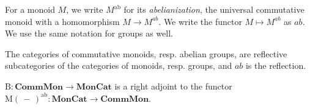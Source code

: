 \documentclass{amsbook} %
\newcommand{\mb}{\mathbf}
\newcommand{\cmon}{\ensuremath{\mb{CommMon}}}
\newcommand{\moncat}{\ensuremath{\mb{MonCat}}}
\numberwithin{section}{chapter}
\begin{document}
\begin{Defi} For a monoid $M$, we write $M^{\mathrm{ab}}$ for its \emph{abelianization}, the universal commutative monoid with a homomorphism $M \to M^{ab}$.  We write the functor $M \mapsto M^{ab}$ as $ab$. We use the same notation for groups as well.
\end{Defi}

\begin{rem}
The categories of commutative monoids, resp. abelian groups, are reflective subcategories of the categories of monoids, resp. groups, and $ab$ is the reflection.
\end{rem}


\begin{prop}\label{Moradj} $\mathrm{B}: \cmon \to \moncat$ is a right adjoint to the functor $\mathrm{M}(\, - \,)^{\mathrm{ab}} : \moncat \to \cmon$.
\end{prop}
\end{document}
